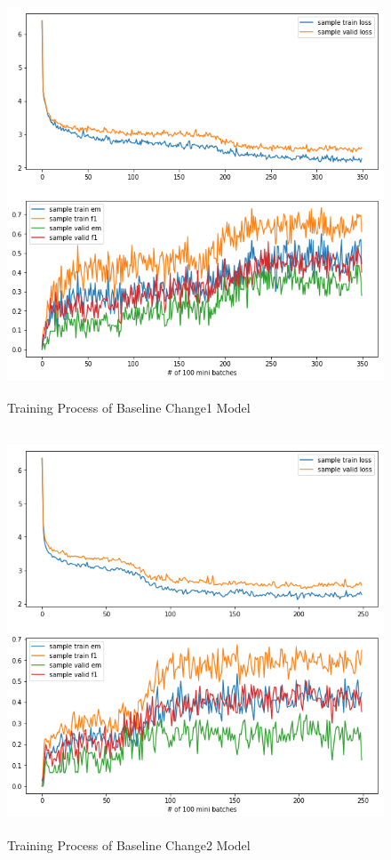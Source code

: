 \documentclass[modernstyle,12pt]{sjsuthesis}
\theoremstyle{definition}
\begin{document}
\begin{figure}[htbp]\centering
  \includegraphics[width=12cm, height=12cm]{figures/match_change1.png}
  \caption{Training Process of Baseline Change1 Model}
  \label{f:baseline_change1}
\end{figure}

\begin{figure}[htbp]\centering
  \includegraphics[width=12cm, height=12cm]{figures/match_change2.png}
  \caption{Training Process of Baseline Change2 Model}
  \label{f:baseline_change2}
\end{figure}
\end{document}
